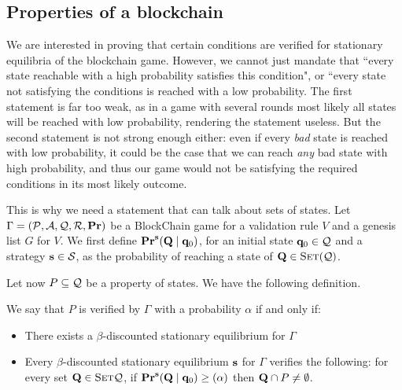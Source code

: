 \subsection{Properties of a blockchain}

We are interested in proving that certain conditions are verified for stationary equilibria of the blockchain game. 
However, we cannot just mandate that ``every state reachable with a high probability satisfies this condition", or 
``every state not satisfying the conditions is reached with a low probability. The first statement is far too weak, as in a game with several rounds 
most likely all states will be reached with low probability, rendering the statement useless. But the second statement is not strong enough either: even if every \emph{bad} state is reached with 
low probability, it could be the case that we can reach \emph{any} bad state with high probability, and thus our game would not be satisfying the 
required conditions in its most likely outcome. 

This is why we need a statement that can talk about sets of states. Let $\Gamma = (\mathcal{P},\mathcal{A},\mathcal{Q},\mathcal{R},\mathbf{Pr})$ be a BlockChain 
game for a validation rule $V$ and a genesis list $G$ for $V$. We first define $\mathbf{Pr}^{\mathbf{s}}(\mathbf{Q} \mid \mathbf{q}_0)$, for an initial state 
$\mathbf{q}_0 \in \mathcal{Q}$ and a strategy $\mathbf{s} \in \mathcal{S}$, as the probability of reaching a state of $\mathbf{Q} \in \text{\sc Set}(\mathcal{Q})$. 

Let now $P\subseteq \mathcal{Q}$ be a property of states. We have the following definition. 

\begin{mydef}
	We say that $P$ is verified by $\Gamma$ with a probability $\alpha$ if and only if:
	\begin{itemize}
		\item There exists a $\beta$-discounted stationary equilibrium for $\Gamma$ \\
		\item Every $\beta$-discounted stationary equilibrium $\mathbf{s}$ for $\Gamma$ verifies the following: 
		for every set $\mathbf{Q} \in \text{\sc Set}{\mathcal{Q}}$, if $\mathbf{Pr}^{\mathbf{s}}(\mathbf{Q} \mid \mathbf{q}_0)\geq(\alpha)$ then $\mathbf{Q} \cap P \neq \emptyset$.	
		\end{itemize}
\end{mydef}



